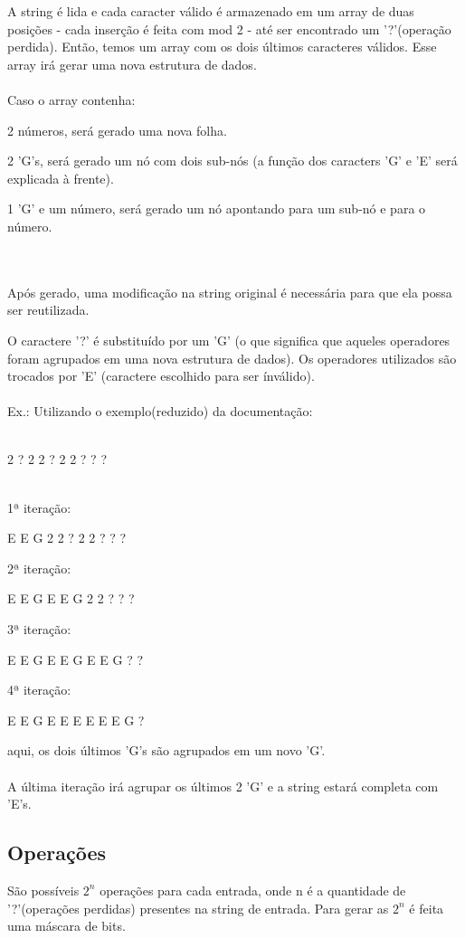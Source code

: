 \documentclass{article}
\begin{document}
A string é lida e cada caracter válido é armazenado em um array de duas posições - cada inserção é feita com mod 2 - até ser encontrado um '?'(operação perdida). Então, temos um array com os dois últimos caracteres válidos. Esse array irá gerar uma nova estrutura de dados.
\\
\\
Caso o array contenha:
\begin{list_type}  
\item 2 números, será gerado uma nova folha. 
\item 2 'G's, será gerado um nó com dois sub-nós (a função dos caracters 'G' e 'E' será explicada à frente).
\item 1 'G' e um número, será gerado um nó apontando para um sub-nó e para o número.
\end{list_type}
\\
\\
Após gerado, uma modificação na string original é necessária para que ela possa ser reutilizada.

O caractere '?' é substituído por um 'G' (o que significa que aqueles operadores foram agrupados em uma nova estrutura de dados). Os operadores utilizados são trocados por 'E' (caractere escolhido para ser ínválido).
\\
\\
Ex.:
Utilizando o exemplo(reduzido) da documentação:\\ \\
{ 2 ? 2 2 ? 2 2 ? ? ?\par
}\\
1ª iteração:

{\centering
 E E G 2 2 ? 2 2 ? ? ?\par
}
2ª iteração:

{\centering
 E E G E E G 2 2 ? ? ?\par
}
3ª iteração:

{\centering
 E E G E E G E E G ? ?\par
}

4ª iteração:

{\centering
 E E G E E E E E E G ?\par
}

aqui, os dois últimos 'G's são agrupados em um novo 'G'.
\\
\\
A última iteração irá agrupar os últimos 2 'G' e a string estará completa com 'E's.

\subsection{Operações}
São possíveis $2^n$ operações para cada entrada, onde n é a quantidade de '?'(operações perdidas) presentes na string de entrada.
Para gerar as $2^n$ é feita uma máscara de bits.
\end{document}
